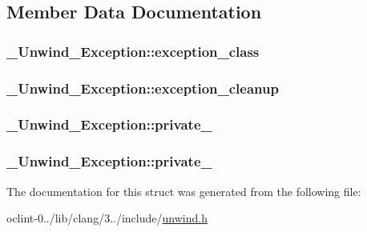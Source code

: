 \subsection{Member Data Documentation}
\hypertarget{struct__Unwind__Exception_ade34d40df51766d7ff384a01237209ae}{
\subsubsection[{exception\-\_\-class}]{ \-\_\-\-Unwind\-\_\-\-Exception\-::exception\-\_\-class}}\label{struct__Unwind__Exception_ade34d40df51766d7ff384a01237209ae}
\hypertarget{struct__Unwind__Exception_a44d69c695cdcc6fcde54ae458a69a4c8}{
\subsubsection[{exception\-\_\-cleanup}]{ \-\_\-\-Unwind\-\_\-\-Exception\-::exception\-\_\-cleanup}}\label{struct__Unwind__Exception_a44d69c695cdcc6fcde54ae458a69a4c8}
\hypertarget{struct__Unwind__Exception_a90fbbe59c5adade160b6bb21b5f71d3d}{
\subsubsection[{private\-\_\-1}]{ \-\_\-\-Unwind\-\_\-\-Exception\-::private\-\_}}\label{struct__Unwind__Exception_a90fbbe59c5adade160b6bb21b5f71d3d}
\hypertarget{struct__Unwind__Exception_a5baef90b9b72c2b612cf44326674ef24}{
\subsubsection[{private\-\_\-2}]{ \-\_\-\-Unwind\-\_\-\-Exception\-::private\-\_}}\label{struct__Unwind__Exception_a5baef90b9b72c2b612cf44326674ef24}


The documentation for this struct was generated from the following file\-:\begin{DoxyCompactItemize}
\item 
oclint-\/0../lib/clang/3../include/\hyperlink{unwind_8h}{unwind.\-h}\end{DoxyCompactItemize}
